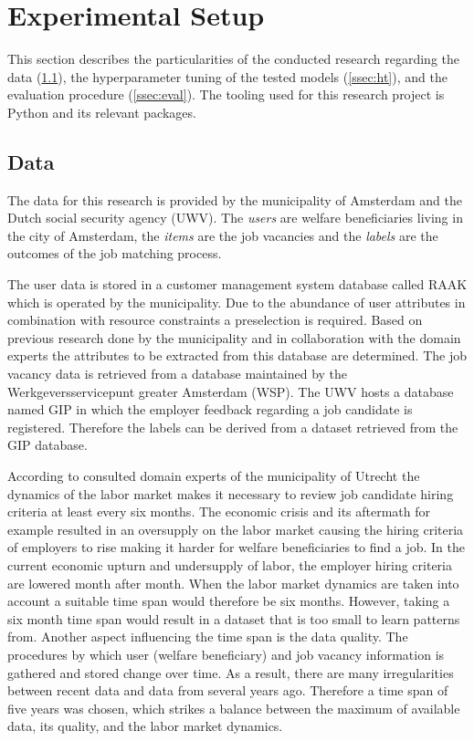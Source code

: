 \section{Experimental Setup}
\label{sec:setup}
This section describes the particularities of the conducted research regarding the data (\ref{ssec:data}), the hyperparameter tuning of the tested models (\ref{ssec:ht}), and the evaluation procedure (\ref{ssec:eval}). 
The tooling used for this research project is Python and its relevant packages.

\subsection{Data}
\label{ssec:data}
The data for this research is provided by the municipality of Amsterdam and the Dutch social security agency (UWV).
The \textit{users} are welfare beneficiaries living in the city of Amsterdam, the \textit{items} are the job vacancies and the \textit{labels} are the outcomes of the job matching process.

The user data is stored in a customer management system database called RAAK which is operated by the municipality.
Due to the abundance of user attributes in combination with resource constraints a preselection is required. 
Based on previous research done by the municipality and in collaboration with the domain experts the attributes to be extracted from this database are determined. 
The job vacancy data is retrieved from a database maintained by the Werkgeversservicepunt greater Amsterdam (WSP).
The UWV hosts a database named GIP in which the employer feedback regarding a job candidate is registered.
Therefore the labels can be derived from a dataset retrieved from the GIP database.

According to consulted domain experts of the municipality of Utrecht the dynamics of the labor market makes it necessary to review job candidate hiring criteria at least every six months.
The economic crisis and its aftermath for example resulted in an oversupply on the labor market causing the hiring criteria of employers to rise making it harder for welfare beneficiaries to find a job.
In the current economic upturn and undersupply of labor, the employer hiring criteria are lowered month after month. 
When the labor market dynamics are taken into account a suitable time span would therefore be six months.
However, taking a six month time span would result in a dataset that is too small to learn patterns from.
Another aspect influencing the time span is the data quality.
The procedures by which user (welfare beneficiary) and job vacancy information is gathered and stored change over time.
As a result, there are many irregularities between recent data and data from several years ago.
Therefore a time span of five years was chosen, which strikes a balance between the maximum of available data, its quality, and the labor market dynamics.

